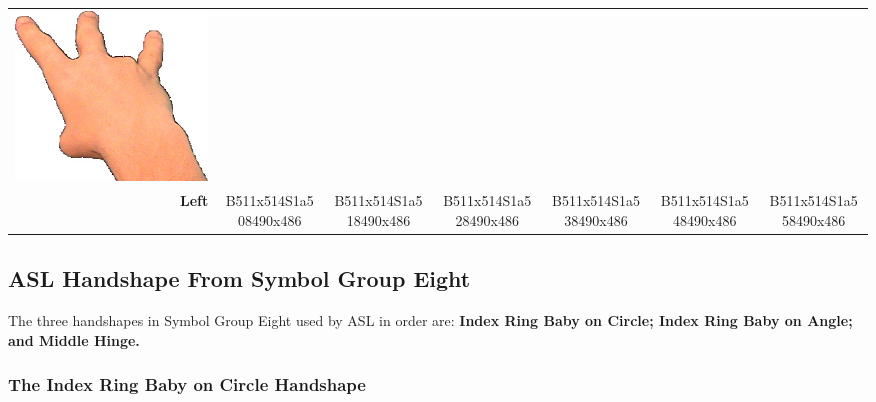 \documentclass{article}
\begin{document}
\begin{center}
\begin{tabular}{r*{6}{c}}
\includegraphics[scale=0.1]{images/07-01-6.jpg}\\
\textbf{Left}&
B511x514S1a508490x486&
B511x514S1a518490x486&
B511x514S1a528490x486&
B511x514S1a538490x486&
B511x514S1a548490x486&
B511x514S1a558490x486\\
\end{tabular}
\end{center}

\subsection{ASL Handshape From Symbol Group Eight}

The three handshapes in Symbol Group Eight used by ASL in order are:
{\bf
Index Ring Baby on Circle;
Index Ring Baby on Angle;
and Middle Hinge.
}

\subsubsection{The Index Ring Baby on Circle Handshape}
\end{document}
